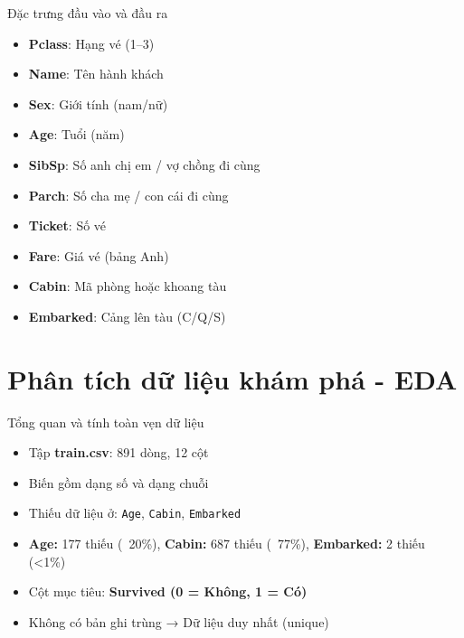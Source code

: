 \documentclass[
	11pt
]{beamer}
\begin{document}
\begin{frame}{Đặc trưng đầu vào và đầu ra}

\begin{itemize}
    \item \textbf{Pclass}: Hạng vé (1–3)
    \item \textbf{Name}: Tên hành khách
    \item \textbf{Sex}: Giới tính (nam/nữ)
    \item \textbf{Age}: Tuổi (năm)
    \item \textbf{SibSp}: Số anh chị em / vợ chồng đi cùng
    \item \textbf{Parch}: Số cha mẹ / con cái đi cùng
    \item \textbf{Ticket}: Số vé
    \item \textbf{Fare}: Giá vé (bảng Anh)
    \item \textbf{Cabin}: Mã phòng hoặc khoang tàu
    \item \textbf{Embarked}: Cảng lên tàu (C/Q/S)
\end{itemize}



\centering
{}

\end{frame}

\section{Phân tích dữ liệu khám phá - EDA}
\begin{frame}{Tổng quan và tính toàn vẹn dữ liệu}
\begin{itemize}
    \item Tập \textbf{train.csv}: 891 dòng, 12 cột  
    \item Biến gồm dạng số và dạng chuỗi  
    \item Thiếu dữ liệu ở: \texttt{Age}, \texttt{Cabin}, \texttt{Embarked}  
    \item \textbf{Age:} 177 thiếu (~20\%), \textbf{Cabin:} 687 thiếu (~77\%), \textbf{Embarked:} 2 thiếu (<1\%)  
    \item Cột mục tiêu: \textbf{Survived (0 = Không, 1 = Có)}  
    \item Không có bản ghi trùng → Dữ liệu duy nhất (unique)  
\end{itemize}
\end{frame}
\end{document}
